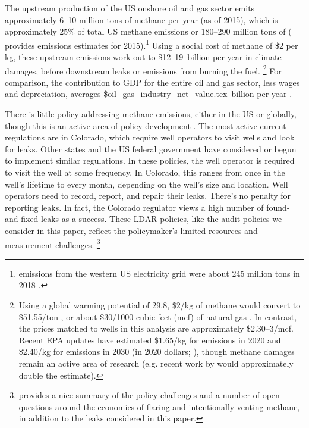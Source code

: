\documentclass[12pt,oneside,letterpaper]{article}
\theoremstyle{definition}
\begin{document}
\begin{refsection}
The upstream production of the US onshore oil and gas sector emits approximately 6--10 million tons of methane per year (as of 2015), which is approximately
25\%
of total US methane emissions or 180--290 million tons of 
(\cite{Alvarez/etal:2018} provides emissions estimates for 2015).\footnote{%
 emissions from the western US electricity grid were about 245 million tons in 2018
\parencite{epa-egrid-2018}.
}
Using a social cost of methane of \$2 per kg, these upstream emissions work out to \$12--19~billion per year in climate damages, before downstream leaks or emissions from burning the fuel.%
\footnote{%
\label{fn:scghg}
Using a global warming potential of 29.8, \$2/kg of methane would convert to \$51.55/ton , or about \$30/1000 cubic feet (mcf) of natural gas \parencite{ipcc_ar6_methane_gwp}.
In contrast, the prices matched to wells in this analysis are approximately \$2.30--3/mcf.
Recent \gls{EPA} updates have estimated \$1.65/kg for emissions in 2020 and \$2.40/kg for emissions in 2030 (in 2020 dollars; \cite{EPASCC:2023}), though methane damages remain an active area of research
(e.g. recent work by \cite{McDuffie/etal:2023} would approximately double the estimate).
}
For comparison, the contribution to \gls{GDP} for the entire oil and gas sector, less wages and depreciation, averages
\${oil_gas_industry_net_value.tex}~billion per year
\parencite{bea_output, bea_depreciation}.


There is little policy addressing methane emissions, either in the US or globally, though this is an active area of policy development
\parencite{EPA-methane-rule-RIA-2023}.
The most active current regulations are in Colorado, which require well operators to visit wells and look for leaks.
Other states and the US federal government have considered or begun to implement similar regulations.
In these policies, the well operator is required to visit the well at some frequency.
In Colorado, this ranges from once in the well's lifetime to every month, depending on the well's size and location.
Well operators need to record, report, and repair  their leaks.
There's no penalty for reporting leaks.
In fact, the Colorado regulator views a high number of found-and-fixed leaks as a success.
These \gls{LDAR} policies, like the audit policies we consider in this paper, reflect the policymaker's limited resources and measurement challenges.%
\footnote{%
\textcite{Agerton/Gilbert/Upton:2023} provides a nice summary of the policy challenges and a number of open questions around the economics of flaring and intentionally venting methane, in addition to the leaks considered in this paper.
}


\end{refsection}
\end{document}
